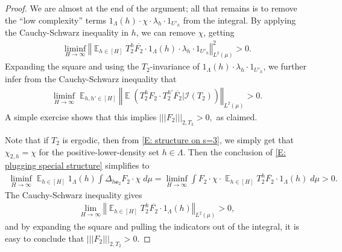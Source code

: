 \documentclass[10pt,a4paper]{amsart}
\newcommand{\CI}{{\mathcal I}}
\DeclareMathOperator*{\E}{\mathbb{E}}
\newcommand{\abs}[1]{\mathopen{}\left| #1\mathclose{}\right|}
\newcommand{\be}{{\mathbf{e}}}
\newcommand{\nnorm}[1]{\lvert\!|\!| #1|\!|\!\rvert}
\newcommand{\norm}[1]{\left\Vert #1\right\Vert}
\begin{document}
\begin{proof}
    We are almost at the end of the argument; all that remains is to remove the ``low complexity'' terms $1_{\Lambda}(h)\cdot \chi\cdot \lambda_h\cdot 1_{U'_h}$ from the integral. By applying the Cauchy-Schwarz inequality in $h$, we can remove $\chi$, getting
    \begin{align*}
        \liminf_{H\to\infty} \norm{\E_{h\in[H]}T_2^h \overline{F_2}\cdot 1_{\Lambda}(h)\cdot \lambda_h\cdot 1_{U'_h}}_{L^2(\mu)}^2 > 0.
    \end{align*}
    Expanding the square and using the $T_2$-invariance of $1_{\Lambda}(h)\cdot\lambda_h\cdot 1_{U'_h}$, we further infer from the Cauchy-Schwarz inequality that
    \begin{align*}
        \liminf_{H\to\infty} \E_{h,h'\in[H]}\norm{\E(T_2^h F_2\cdot T_2^{h'}\overline{F_2}|\CI(T_2))}_{L^2(\mu)}>0.
    \end{align*}
    A simple exercise shows that this implies $\nnorm{F_2}_{2, T_2}>0,$ as claimed.
    
    Note that if $T_2$ is ergodic, then from \eqref{E: structure on s=3}, we simply get that $\chi_{2,h} = \chi$ for the positive-lower-density set $h\in\Lambda$. Then the conclusion of \eqref{E: plugging special structure} simplifies to
    \begin{align*}
        \liminf_{H\to\infty} \E_{h\in[H]}1_\Lambda(h)\int \Delta_{h\be_2} F_2\cdot \chi\; d\mu %
        = \liminf_{H\to\infty} \int F_2\cdot \chi \cdot \E_{h\in[H]} T_2^h \overline{F_2}\cdot 1_\Lambda(h)\; d\mu > 0.
    \end{align*}
    The Cauchy-Schwarz inequality gives 
    \begin{align*}
        \lim_{H\to\infty}\norm{\E_{h\in[H]}T_2^h \overline{F_2}\cdot 1_\Lambda(h)}_{L^2(\mu)}>0,
    \end{align*}
    and by expanding the square and pulling the indicators out of the integral, it is easy to conclude that $\nnorm{F_2}_{2, T_2}>0$.
\end{proof}
\end{document}
